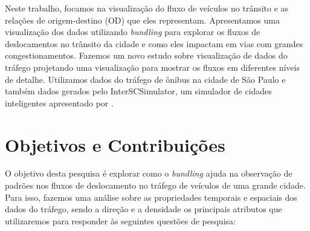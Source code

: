  Neste trabalho, focamos na visualização do fluxo de veículos no trânsito e as
relações de origem-destino (OD) que eles representam. Apresentamos uma
visualização dos dados utilizando \emph{bundling} para explorar os fluxos de
deslocamentos no trânsito da cidade e como eles impactam em vias com grandes
congestionamentos. Fazemos um novo estudo sobre visualização de dados do
tráfego projetando uma visualização para mostrar os fluxos em diferentes níveis
de detalhe. Utilizamos dados do tráfego de ônibus na cidade de São Paulo e
também dados gerados pelo InterSCSimulator, um simulador de cidades
inteligentes apresentado por \citet{mabs2017}.

\section{Objetivos e Contribuições}
  O objetivo desta pesquisa é explorar como o \emph{bundling} ajuda na
observação de padrões nos fluxos de deslocamento no tráfego de veículos de uma
grande cidade. Para isso, fazemos uma análise sobre as propriedades temporais e
espaciais dos dados do tráfego, sendo a direção e a densidade os principais
atributos que utilizaremos para responder às seguintes questões de pesquisa:

